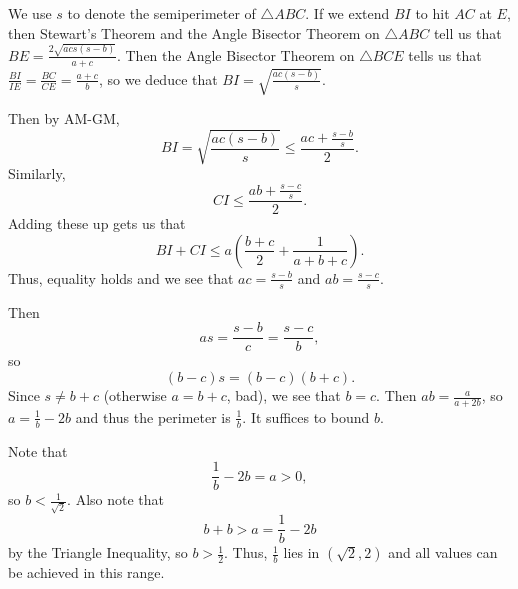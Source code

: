 We use $s$ to denote the semiperimeter of $\triangle{ABC}$. If we extend $BI$ to hit $AC$ at $E$, then Stewart's Theorem and the Angle Bisector Theorem on $\triangle{ABC}$ tell us that $BE=\frac{2\sqrt{acs\left(s-b\right)}}{a+c}$. Then the Angle Bisector Theorem on $\triangle{BCE}$ tells us that $\frac{BI}{IE}=\frac{BC}{CE}=\frac{a+c}{b}$, so we deduce that $BI=\sqrt{\frac{ac\left(s-b\right)}{s}}$.

Then by AM-GM, \[BI=\sqrt{\frac{ac\left(s-b\right)}{s}}\leq\frac{ac+\frac{s-b}{s}}{2}.\] Similarly, \[CI\leq\frac{ab+\frac{s-c}{s}}{2}.\] Adding these up gets us that \[BI+CI\leq a\left(\frac{b+c}{2}+\frac{1}{a+b+c}\right).\] Thus, equality holds and we see that $ac=\frac{s-b}{s}$ and $ab=\frac{s-c}{s}$.

Then \[as=\frac{s-b}{c}=\frac{s-c}{b},\] so \[\left(b-c\right)s=\left(b-c\right)\left(b+c\right).\] Since $s\neq b+c$ (otherwise $a=b+c$, bad), we see that $b=c$. Then $ab=\frac{a}{a+2b}$, so $a=\frac{1}{b}-2b$ and thus the perimeter is $\frac{1}{b}$. It suffices to bound $b$.

Note that \[\frac{1}{b}-2b=a>0,\] so $b<\frac{1}{\sqrt{2}}$. Also note that \[b+b>a=\frac{1}{b}-2b\] by the Triangle Inequality, so $b>\frac{1}{2}$. Thus, $\frac{1}{b}$ lies in $\boxed{\left(\sqrt{2},2\right)}$ and all values can be achieved in this range.